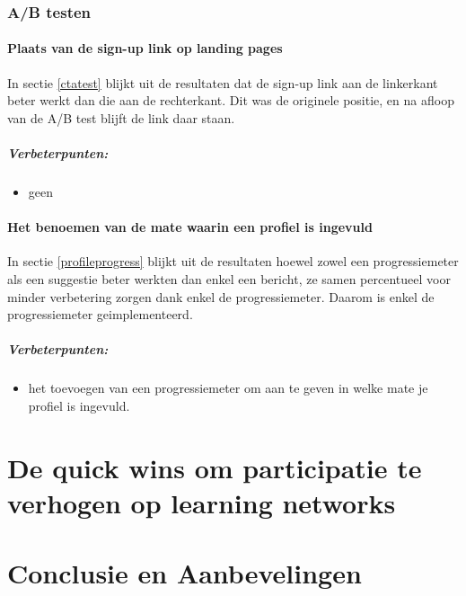 \documentclass[a4paper, 10pt, pdftex]{report}
\begin{document}
    \subsection{A/B testen}
      \subsubsection{Plaats van de sign-up link op landing pages}
        In sectie \ref{ctatest} blijkt uit de resultaten dat de sign-up link aan de linkerkant beter werkt dan die aan de rechterkant. Dit was de originele positie, en na afloop van de A/B test blijft de link daar staan.

    \paragraph{\textbf{Verbeterpunten:}}
      \begin{itemize}
        \item geen
      \end{itemize}

      \subsubsection{Het benoemen van de mate waarin een profiel is ingevuld}
        In sectie \ref{profileprogress} blijkt uit de resultaten hoewel zowel een progressiemeter als een suggestie beter werkten dan enkel een bericht, ze samen percentueel voor minder verbetering zorgen dank enkel de progressiemeter. Daarom is enkel de progressiemeter geimplementeerd.

    \paragraph{\textbf{Verbeterpunten:}}
      \begin{itemize}
        \item het toevoegen van een progressiemeter om aan te geven in welke mate je profiel is ingevuld.
      \end{itemize}

  \newpage
  \chapter{De quick wins om participatie te verhogen op learning networks}
    \newpage

  \newpage
  \chapter*{Conclusie en Aanbevelingen}
\end{document}
